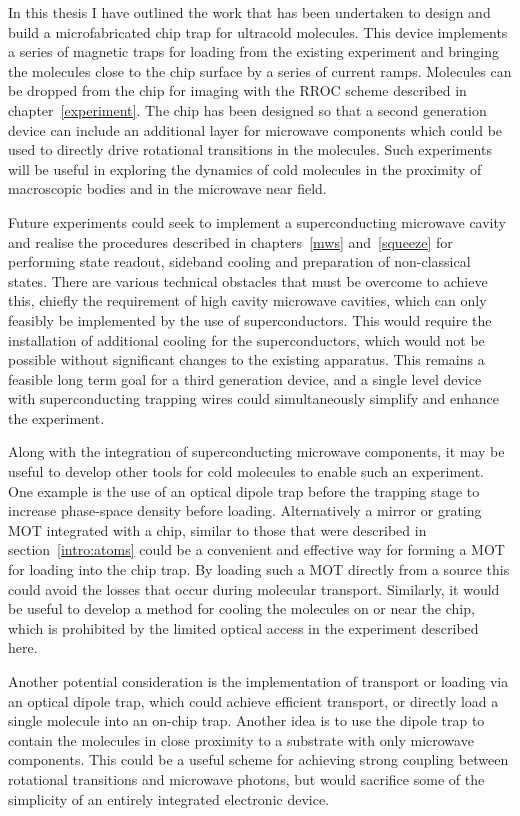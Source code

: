 In this thesis I have outlined the work that has been undertaken to design and
build a microfabricated chip trap for ultracold molecules. This device
implements a series of magnetic traps for loading from the existing \CaF{}
experiment and bringing the molecules close to the chip surface by a series of
current ramps. Molecules can be dropped from the chip for imaging with the RROC
scheme described in chapter~\ref{experiment}. The chip has been designed so 
that a second generation device can include an additional layer for microwave
components which could be used to directly drive rotational transitions in the
molecules. Such experiments will be useful in exploring the dynamics of cold
molecules in the proximity of macroscopic bodies and in the microwave near
field.

Future experiments could seek to implement a superconducting microwave cavity
and realise the procedures described in chapters~\ref{mws} and~\ref{squeeze}
for performing state readout, sideband cooling and preparation of non-classical
states. There are various technical obstacles that must be overcome to achieve
this, chiefly the requirement of high cavity microwave cavities, which can only
feasibly be implemented by the use of superconductors.  This would require the
installation of additional cooling for the superconductors, which would not be
possible without significant changes to the existing apparatus. This
remains a feasible long term goal for a third generation device, and a
single level device with superconducting trapping wires could simultaneously
simplify and enhance the experiment.

Along with the integration of superconducting microwave components, it may be
useful to develop other tools for cold molecules to enable such an experiment.
One example is the use of an optical dipole trap before the trapping stage to
increase phase-space density before loading.  Alternatively a mirror or grating
MOT integrated with a chip, similar to those that were described in
section~\ref{intro:atoms} could be a convenient and effective way for forming a
\CaF{} MOT for loading into the chip trap. By loading such a MOT directly from
a source this could avoid the losses that occur during molecular transport.
Similarly, it would be useful to develop a method for cooling the molecules on
or near the chip, which is prohibited by the limited optical access in the
experiment described here.

Another potential consideration is the implementation of transport or loading
via an optical dipole trap, which could achieve efficient transport, or
directly load a single molecule into an on-chip trap. Another idea is to use
the dipole trap to contain the molecules in close proximity to a substrate with
only microwave components. This could be a useful scheme for achieving strong
coupling between rotational transitions and microwave photons, but would
sacrifice some of the simplicity of an entirely integrated electronic device.

